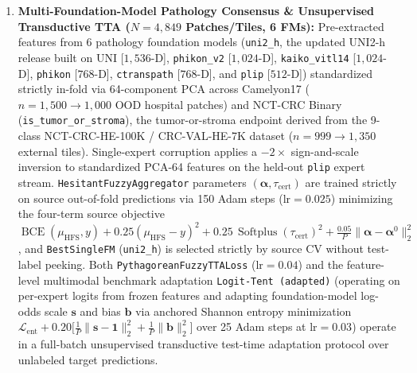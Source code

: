 \documentclass[10pt,twocolumn]{article}
\begin{document}
\begin{enumerate}[leftmargin=1.4em,itemsep=1pt,topsep=2pt]
    PanCanAtlas RNA-Seq universe containing the top-$1,000$ MAD expressed protein-coding genes
    screened across the pooled cohort ($18,495$ common genes $\to 15,636$ passing $\ge 95\%$
    non-missing and median $\log_2(\text{RSEM}+1)\ge 1.0$ QC; $n=2,929$ observed, zero outcome
    labels or curated gene lists). Fold standardization and supervised in-fold fuzzy-rough
    reduction to a fixed budget of $K^*=20$ genes then run inside each training fold, and
    pathway enrichment is audited over all $m=676$ testable pathways ($K_{\text{bg}} \ge 2$
    unique genes) against this predeclared $N_{\text{bg}}=1,000$ Reactome background
    \cite{milacic2024reactome}.
    \item \textbf{Multi-Foundation-Model Pathology Consensus \& Unsupervised Transductive TTA
    ($N=4,849$ Patches/Tiles, 6 FMs):} Pre-extracted features from 6 pathology foundation
    models (\texttt{uni2\_h}, the updated UNI2-h release built on UNI
    \cite{chen2024uni,mahmoodlab2025uni2h}
    [$1,536$-D], \texttt{phikon\_v2}
    \cite{filiot2024phikonv2} [$1,024$-D], \texttt{kaiko\_\allowbreak vitl14}
    \cite{kaiko2024towards} [$1,024$-D], \texttt{phikon} \cite{filiot2023scaling} [$768$-D],
    \texttt{ctranspath} \cite{wang2022transformer} [$768$-D], and \texttt{plip}
    \cite{huang2023visual} [$512$-D]) standardized strictly in-fold via 64-component PCA across
    Camelyon17 \cite{bandi2018detection} ($n=1,500 \to 1,000$ OOD hospital patches) and
    NCT-CRC Binary (\texttt{is\_tumor\_or\_stroma}), the tumor-or-stroma endpoint derived
    from the 9-class NCT-CRC-HE-100K / CRC-VAL-HE-7K dataset \cite{kather2019predicting}
    ($n=999 \to 1,350$ external tiles). Single-expert corruption applies a $-2\times$
    sign-and-scale inversion to standardized PCA-64 features on the held-out \texttt{plip}
    expert stream.
    \texttt{HesitantFuzzyAggregator} parameters $(\bm{\alpha},\tau_{\text{cert}})$ are trained
    strictly on source out-of-fold predictions via 150 Adam steps ($\text{lr}=0.025$)
    minimizing
    the four-term source objective $\operatorname{BCE}(\mu_{\text{HFS}}, y) +
    0.25(\mu_{\text{HFS}}
    - y)^2 + 0.25\,\operatorname{Softplus}(\tau_{\text{cert}})^2 + \frac{0.05}{P}\|\bm{\alpha}
    -
    \bm{\alpha}^0\|_2^2$, and
    \texttt{BestSingleFM} (\texttt{uni2\_h}) is selected strictly by source CV without
    test-label peeking. Both \texttt{PythagoreanFuzzyTTALoss} ($\text{lr}=0.04$) and
    the feature-level multimodal benchmark adaptation \texttt{Logit-Tent (adapted)}
    \cite{wang2021tent} (operating on per-expert logits from frozen features and adapting
    foundation-model log-odds scale $\bm{s}$ and bias $\bm{b}$ via anchored Shannon entropy
    minimization $\mathcal{L}_{\text{ent}} + 0.20\big[\frac{1}{P}\|\bm{s}-\mathbf{1}\|_2^2 +
    \frac{1}{P}\|\bm{b}\|_2^2\big]$ over 25 Adam steps at $\text{lr}=0.03$) operate in a
    full-batch unsupervised transductive test-time adaptation protocol over unlabeled target
    predictions.
\end{enumerate}
\end{document}
